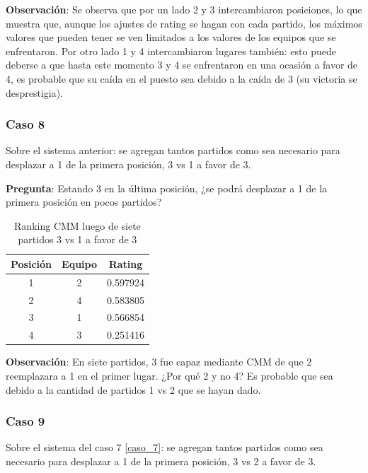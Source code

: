 \textbf{Observación}: Se observa que por un lado 2 y 3 intercambiaron posiciones, lo que muestra que, aunque los ajustes de rating se hagan con cada partido, los máximos valores que pueden tener se ven limitados a los valores de los equipos que se enfrentaron. Por otro lado 1 y 4 intercambiaron lugares también: esto puede deberse a que hasta este momento 3 y 4 se enfrentaron en una ocasión a favor de 4, es probable que su caída en el puesto sea debido a la caída de 3 (su victoria se desprestigia).

\subsubsection*{Caso 8}

Sobre el sistema anterior: se agregan tantos partidos como sea necesario para desplazar a 1 de la primera posición, 3 vs 1 a favor de 3.

\textbf{Pregunta}: Estando 3 en la última posición, ¿se podrá desplazar a 1 de la primera posición en pocos partidos?

\begin{table}[h!]
    \begin{center}
        \begin{tabular}{|c|c|c|}
        \hline
        \textbf{Posición} & \textbf{Equipo} & \textbf{Rating} \\
        \hline
        1 & 2 & 0.597924\\
        2 & 4 & 0.583805\\
        3 & 1 & 0.566854\\
        4 & 3 & 0.251416\\
        \hline
        \end{tabular}
        \caption{Ranking CMM luego de siete partidos 3 vs 1 a favor de 3}
        \label{cmm_caso_8}
    \end{center}
\end{table}

\textbf{Observación}: En siete partidos, 3 fue capaz mediante CMM de que 2 reemplazara a 1 en el primer lugar. ¿Por qué 2 y no 4? Es probable que sea debido a la cantidad de partidos 1 vs 2 que se hayan dado.

\subsubsection*{Caso 9}\label{caso_9}

Sobre el sistema del caso 7 \ref{caso_7}: se agregan tantos partidos como sea necesario para desplazar a 1 de la primera posición, 3 vs 2 a favor de 3.

